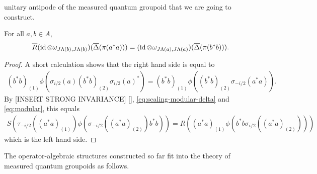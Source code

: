 unitary antipode of the measured quantum groupoid that we are going to
construct.
\begin{Lem} \label{lemma:vn-r-characterisation}
For all $a,b\in A$,
\begin{align*}
  \overline{R}(\operatorname{id} \otimes
  \omega_{J\Lambda(b),J\Lambda(b)})(\overline{\Delta}(\pi(a^{*}a))) = (\operatorname{id}
  \otimes \omega_{J\Lambda(a),J\Lambda(a)})(\overline{\Delta}(\pi(b^{*}b))).
\end{align*}
\end{Lem}
\begin{proof}
A short calculation shows that  the right hand side is equal to
  \begin{align*}
    (b^{*}b)_{(1)}\phi(\sigma_{i/2}(a)(b^{*}b)_{(2)}\sigma_{i/2}(a)^{*})
    = (b^{*}b)_{(1)}\phi((b^{*}b)_{(2)}\sigma_{-i/2}(a^{*}a)).
  \end{align*}
  By [INSERT STRONG INVARIANCE] \ref{},
  \eqref{eq:scaling-modular-delta}  and \eqref{eq:modular}, this equals 
  \begin{align*}
    S(\tau_{-i/2}((a^{*}a)_{(1)})
    \phi(\sigma_{-i/2}((a^{*}a)_{(2)})b^{*}b)) = 
    R((a^{*}a)_{(1)}\phi(b^{*}b\sigma_{i/2}((a^{*}a)_{(2)})))
  \end{align*}  
which is the  left hand side.
\end{proof}

The operator-algebraic structures constructed so far fit into the
theory of measured quantum groupoids as follows.

